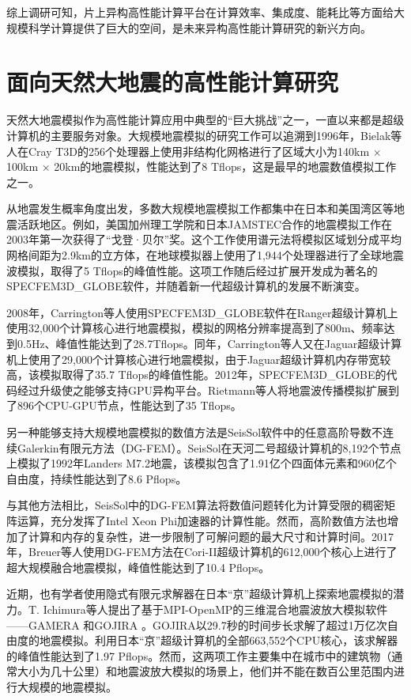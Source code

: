 综上调研可知，片上异构高性能计算平台在计算效率、集成度、能耗比等方面给大规模科学计算提供了巨大的空间，是未来异构高性能计算研究的新兴方向。

\section{面向天然大地震的高性能计算研究}

天然大地震模拟作为高性能计算应用中典型的“巨大挑战”之一，一直以来都是超级计算机的主要服务对象。大规模地震模拟的研究工作可以追溯到1996年，Bielak等人在Cray T3D的256个处理器上使用非结构化网格进行了区域大小为140km $\times$ 100km $\times$ 20km的地震模拟\citep{bao1996earthquake}，性能达到了8 Tflops，这是最早的地震数值模拟工作之一。

从地震发生概率角度出发，多数大规模地震模拟工作都集中在日本和美国湾区等地震活跃地区。例如，美国加州理工学院和日本JAMSTEC合作的地震模拟工作在2003年第一次获得了“戈登·贝尔”奖\citep{es-gb-2003}。这个工作使用谱元法\cite{chen2006glueball}将模拟区域划分成平均网格间距为2.9km的立方体，在地球模拟器上使用了1,944个处理器进行了全球地震波模拟，取得了5 Tflops的峰值性能。这项工作随后经过扩展开发成为著名的SPECFEM3D\_GLOBE软件\cite{bozdag2010specfem3d_globe}，并随着新一代超级计算机的发展不断演变。

2008年，Carrington等人使用SPECFEM3D\_GLOBE软件在Ranger超级计算机上使用32,000个计算核心进行地震模拟\cite{carrington2008high}，模拟的网格分辨率提高到了800m、频率达到0.5Hz、峰值性能达到了28.7Tflops。同年，Carrington等人又在Jaguar超级计算机上使用了29,000个计算核心进行地震模拟，由于Jaguar超级计算机内存带宽较高，该模拟取得了35.7 Tflops的峰值性能。2012年，SPECFEM3D\_GLOBE的代码经过升级使之能够支持GPU异构平台。Rietmann等人将地震波传播模拟扩展到了896个CPU-GPU节点\citep{rietmann2012forward}，性能达到了35 Tflops。

另一种能够支持大规模地震模拟的数值方法是SeisSol软件中的任意高阶导数不连续Galerkin有限元方法\cite{godel2010scalability}（DG-FEM）。SeisSol在天河二号超级计算机的8,192个节点上模拟了1992年Landers M7.2地震\citep{tianhe2-2014gb}，该模拟包含了1.91亿个四面体元素和960亿个自由度，持续性能达到了8.6 Pflops。

与其他方法相比，SeisSol中的DG-FEM算法将数值问题转化为计算受限的稠密矩阵运算，充分发挥了Intel Xeon Phi加速器的计算性能。然而，高阶数值方法也增加了计算和内存的复杂性，进一步限制了可解问题的最大尺寸和计算时间。2017年，Breuer等人使用DG-FEM方法在Cori-II超级计算机的612,000个核心上进行了超大规模融合地震模拟\citep{breuer2017edge}，峰值性能达到了10.4 Pflops。

近期，也有学者使用隐式有限元求解器\cite{geradin1983implicit}在日本“京”超级计算机\cite{yokokawa2011k}上探索地震模拟的潜力。T. Ichimura等人提出了基于MPI-OpenMP的三维混合地震波放大模拟软件——GAMERA \citep {ichimura2014physics}和GOJIRA \citep {ichimura2015implicit}。GOJIRA以29.7秒的时间步长求解了超过1万亿次自由度的地震模拟。利用日本“京”超级计算机的全部663,552个CPU核心，该求解器的峰值性能达到了1.97 Pflops。然而，这两项工作主要集中在城市中的建筑物（通常大小为几十公里）和地震波放大模拟的场景上，他们并不能在数百公里范围内进行大规模的地震模拟。

